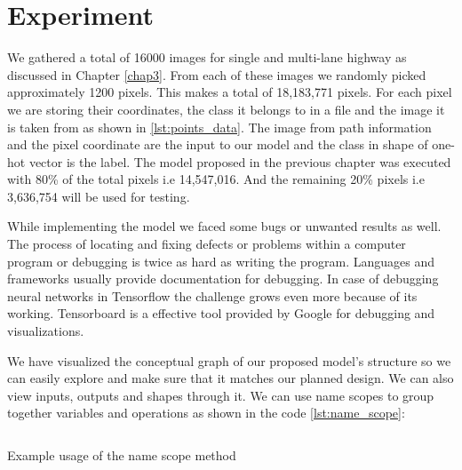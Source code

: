 \section{Experiment}
We gathered a total of 16000 images for single and multi-lane highway as discussed in Chapter \ref{chap3}. From each of these images we randomly picked approximately 1200 pixels. This makes a total of 18,183,771 pixels. For each pixel we are storing their coordinates, the class it belongs to in a file and the image it is taken from as shown in \ref{lst:points_data}. The image from path information and the pixel coordinate are the input to our model and the class in shape of one-hot vector is the label. The model proposed in the previous chapter was executed with 80\% of the total pixels i.e 14,547,016. And the remaining 20\% pixels i.e 3,636,754 will be used for testing.

While implementing the model we faced some bugs or unwanted results as well. The process of locating and fixing defects or problems within a computer program or debugging is twice as hard as writing the program. Languages and frameworks usually provide documentation for debugging. In case of debugging neural networks in Tensorflow the challenge grows even more because of its working. Tensorboard is a effective tool provided by Google for debugging and visualizations.

We have visualized the conceptual graph of our proposed model's structure so we can easily explore and make sure that it matches our planned design. We can also view inputs, outputs and shapes through it. We can use name scopes to group together variables and operations as shown in the code \ref{lst:name_scope}:
\par
\begin{listing}
  \inputminted[frame=lines,framesep=2mm,baselinestretch=1.2,fontsize=\scriptsize,linenos]{python}{Chapter5/name_scope.py}
  \caption{Example usage of the name scope method}
  \label{lst:name_scope}
\end{listing}

